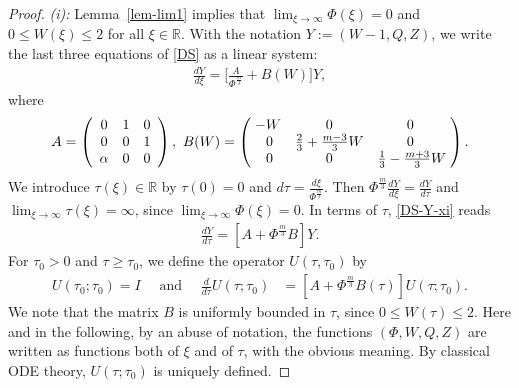 \documentclass{article}%
\newcommand{\alp}{\alpha}
\newcommand{\R}{\mathbb{R}}
\begin{document}
\begin{proof} %
  {\it (i):} Lemma~\ref{lem-lim1} implies that $\lim_{\xi\to\infty}\Phi(\xi)=0$ and 
$0 \leq W(\xi) \leq 2$ for all $\xi \in \R$. With the notation $Y := (W-1,Q,Z)$, 
we write the last three equations of \eqref{DS} as a linear system:
  \begin{align} \label{DS-Y-xi} %
    \frac{dY}{d\xi} = \Big[\frac A{\Phi^{\frac{m}{3}}} + B(W)\Big] Y,
  \end{align}
  where
  \begin{align} \label{def-AB} %
    A= \left(
      \begin{array} [c]{ccc}%
        0 & 1 & 0\\
        0 & 0 & 1\\
        \alp & 0 & 0
      \end{array}
    \right), \ %
    B(W) =\left(
      \begin{array} [c]{ccc}%
        \hspace{-0.5ex}
        -W & 0 & 0\\
        0 & \frac{2}{3}+\frac{m-3}{3}W & 0\\
        0 & 0 &  \frac{1}{3}-\frac{m+3}{3} W \hspace{-0.5ex} 
      \end{array}
    \right).
  \end{align}
We introduce $\tau(\xi) \in \R$ by $\tau(0) = 0$ and $d\tau=\frac{d\xi}{\Phi^{\frac{m}{3}}}$. 
Then $\Phi^{\frac{m}{3}}\frac{dY}{d\xi} = \frac{dY}{d\tau}$ and $\lim_{\xi\to \infty}\tau(\xi)= \infty$,
 since $\lim_{\xi \to \infty}\Phi(\xi) =0 $. In terms of $\tau$, \eqref{DS-Y-xi} reads
  \begin{align}\label{DS-Y-tau}
    \frac{dY}{d\tau} = [A+\Phi^{\frac{m}{3}} B] Y. %
  \end{align}
For $\tau_0 > 0$ and $\tau \geq \tau_{0}$, we define the operator $U(\tau,\tau_0)$ by
  \begin{align*}
     U(\tau_{0};\tau_{0})=I \quad \text{ and } \quad 
    \frac{d}{d\tau}U(\tau;\tau_{0}) &= [A+\Phi^{\frac{m}{3}} B(\tau)] U(\tau;\tau_{0}).
  \end{align*}
We note that the matrix $B$ is uniformly bounded in $\tau$, since 
$0 \leq W(\tau) \leq 2$. Here and in the following, by an abuse of
 notation, the functions $(\Phi,W,Q,Z)$ are written as functions both of $\xi$
 and of $\tau$, with the obvious meaning. By classical ODE theory,
 $U(\tau;\tau_0)$ is uniquely defined.


\end{proof}
\end{document}
